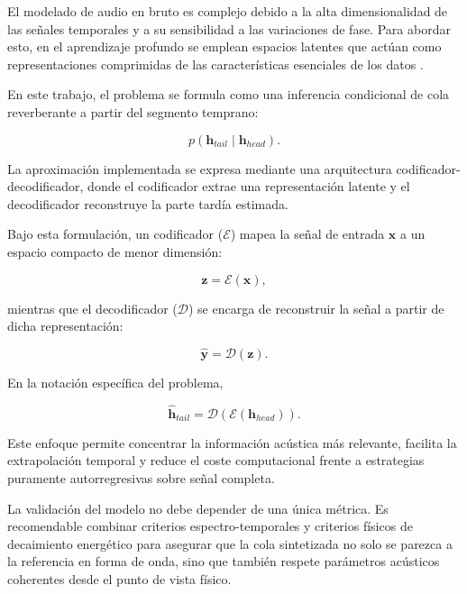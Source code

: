 El modelado de audio en bruto es complejo debido a la alta dimensionalidad de las señales temporales y a su sensibilidad a las variaciones de fase. Para abordar esto, en el aprendizaje profundo se emplean espacios latentes que actúan como representaciones comprimidas de las características esenciales de los datos \cite{Goodfellow2016}. 

En este trabajo, el problema se formula como una inferencia condicional de cola reverberante a partir del segmento temprano:

\begin{equation}
p\left(\mathbf{h}_{tail}\mid\mathbf{h}_{head}\right).
\end{equation}

La aproximación implementada se expresa mediante una arquitectura codificador-decodificador, donde el codificador extrae una representación latente y el decodificador reconstruye la parte tardía estimada.

Bajo esta formulación, un codificador ($ \mathcal{E} $) mapea la señal de entrada $\mathbf{x}$ a un espacio compacto de menor dimensión:

\begin{equation}
\mathbf{z} = \mathcal{E}(\mathbf{x}),
\end{equation}

mientras que el decodificador ($ \mathcal{D} $) se encarga de reconstruir la señal a partir de dicha representación:

\begin{equation}
\hat{\mathbf{y}} = \mathcal{D}(\mathbf{z}).
\end{equation}

En la notación específica del problema,

\begin{equation}
\hat{\mathbf{h}}_{tail} = \mathcal{D}(\mathcal{E}(\mathbf{h}_{head})).
\end{equation}

Este enfoque permite concentrar la información acústica más relevante, facilita la extrapolación temporal y reduce el coste computacional frente a estrategias puramente autorregresivas sobre señal completa.

La validación del modelo no debe depender de una única métrica. Es recomendable combinar criterios espectro-temporales y criterios físicos de decaimiento energético para asegurar que la cola sintetizada no solo se parezca a la referencia en forma de onda, sino que también respete parámetros acústicos coherentes desde el punto de vista físico.

